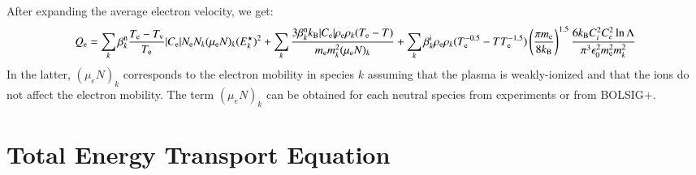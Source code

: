 \documentclass{warpdoc}
\begin{document}
%
After expanding the average electron velocity, we get: 
%
\begin{equation}
Q_{\rm e}
= 
   \sum_k \beta_k^{\rm n} \frac{T_{\rm e}-T_{\rm v}}{T_{\rm e}} |C_{\rm e}| N_{\rm e} N_k (\mu_{\rm e}  N)_k  (E^\star_k)^2
 + \sum_k  \frac{3 \beta_k^{\rm n} k_{\rm B} |C_{\rm e}| \rho_{\rm e} \rho_k  (T_{\rm e}-T)}{m_{\rm e} m_k^2 (\mu_{\rm e}N)_k}        
 + \sum_k \beta_k^{\rm i}  \rho_{\rm e} \rho_k  (T_{\rm e}^{-0.5}-T T_{\rm e}^{-1.5}) \left(\frac{\pi m_{\rm e}}{8 k_{\rm B}}\right)^{1.5}  \frac{6 k_{\rm B} C_i^2 C_e^2 \ln \Lambda}{ \pi^3 \epsilon_0^2 m_{\rm e}^2 m_k^2}  
\end{equation}
%
In the latter, $(\mu_{e} N)_k$ corresponds to the electron mobility in species $k$ assuming that the plasma is weakly-ionized and that the ions do not affect the electron mobility. The term $(\mu_{e} N)_k$ can be obtained for each neutral species from experiments or from BOLSIG+.


\section{Total Energy Transport Equation}
\end{document}
